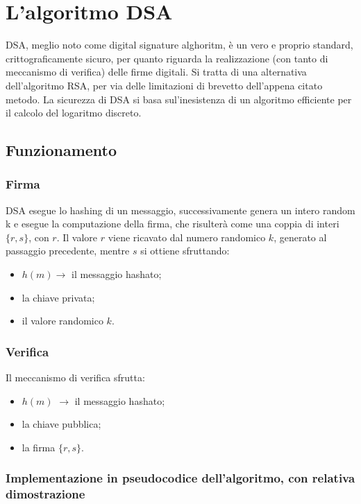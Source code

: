 \chapter{L'algoritmo DSA}

DSA, meglio noto come digital signature alghoritm, è un vero e proprio standard, crittograficamente sicuro, per quanto riguarda la realizzazione (con tanto di meccanismo di verifica) delle firme digitali. Si tratta di una alternativa dell'algoritmo RSA, per via delle limitazioni di brevetto dell'appena citato metodo. La sicurezza di DSA si basa sul'inesistenza di un algoritmo efficiente per il calcolo del logaritmo discreto.

\section{Funzionamento}

\subsection{Firma}
DSA esegue lo hashing di un messaggio, successivamente genera un intero random k e esegue la computazione della firma, che risulterà come una coppia di interi $\{r, s\}$, con $r$. Il valore $r$ viene ricavato dal numero randomico $k$, generato al passaggio precedente, mentre $s$ si ottiene sfruttando: 
\begin{itemize}
	\item $h(m) \rightarrow$ il messaggio hashato;
	\item la chiave privata;
	\item il valore randomico $k$.
\end{itemize} 

\subsection{Verifica}

Il meccanismo di verifica sfrutta:
\begin{itemize}
	\item $h(m)$ $\rightarrow$ il messaggio hashato;
	\item la chiave pubblica;
	\item la firma $\{r, s\}$.
\end{itemize}

\newpage

\subsection{Implementazione in pseudocodice dell'algoritmo, con relativa dimostrazione}

